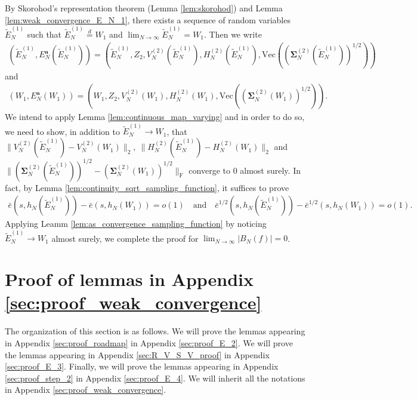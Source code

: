 \documentclass[12pt]{article}
\begin{document}
\noindent By Skorohod's representation theorem (Lemma \ref{lem:skorohod}) and Lemma \ref{lem:weak_convergence_E_N_1}, there exists a sequence of random variables $\tilde{E}_{N}^{(1)}$ such that $\tilde{E}_{N}^{(1)}\overset{d}{=}W_1$ and $\lim_{N\rightarrow\infty}\tilde{E}_{N}^{(1)}=W_1$. Then we write 
\begin{align*}
	(\tilde E_N^{(1)},E_N^{\textbf{a}}(\tilde E_N^{(1)}))=(\tilde E_N^{(1)},Z_2, V_N^{(2)}(\tilde E_N^{(1)}), H_N^{(2)}(\tilde E_N^{(1)}),\mathrm{Vec}((\bm\Sigma_N^{(2)}(\tilde E_N^{(1)}))^{1/2}))
\end{align*}
and 
\begin{align*}
	(W_1, E_N^{\textbf{a}}(W_1))=(W_1,Z_2, V_N^{(2)}(W_1), H_N^{(2)}(W_1),\mathrm{Vec}((\bm\Sigma_N^{(2)}(W_1))^{1/2})).
\end{align*}
We intend to apply Lemma \ref{lem:continuous_map_varying} and in order to do so, we need to show, in addition to $\tilde E_N^{(1)}\rightarrow W_1$, that $\|V_N^{(2)}(\tilde{E}_N^{(1)})-V_N^{(2)}(W_1)\|_2,\ \|H_N^{(2)}(\tilde{E}_N^{(1)})- H_N^{(2)}(W_1)\|_2$ and $\|(\bm\Sigma_N^{(2)}(\tilde{E}_N^{(1)}))^{1/2}-(\bm\Sigma_N^{(2)}(W_1))^{1/2}\|_{\mathrm{F}}$
converge to $0$ almost surely. In fact, by Lemma \ref{lem:continuity_sqrt_sampling_function}, it suffices to prove
\small
\begin{align*}
	\bar e(s,h_N(\tilde E_N^{(1)}))-\bar e(s,h_N(W_1))=o(1)\quad\text{and}\quad \bar e^{1/2}(s,h_N(\tilde E_N^{(1)}))-\bar e^{1/2}(s,h_N(W_1))=o(1).
\end{align*}
\normalsize
Applying Leamm \ref{lem:as_convergence_sampling_function} by noticing $\tilde E_N^{(1)}\rightarrow W_1$ almost surely, we complete the proof for $\lim_{N\rightarrow\infty}|B_N(f)|=0$. 







\section{Proof of lemmas in Appendix \ref{sec:proof_weak_convergence}}\label{sec:supporting_lemmas}

The organization of this section is as follows. We will prove the lemmas appearing in Appendix \ref{sec:proof_roadmap} in Appendix \ref{sec:proof_E_2}. We will prove the lemmas appearing in Appendix \ref{sec:R_V_S_V_proof} in Appendix \ref{sec:proof_E_3}. Finally, we will prove the lemmas appearing in Appendix \ref{sec:proof_step_2} in Appendix \ref{sec:proof_E_4}. We will inherit all the notations in Appendix \ref{sec:proof_weak_convergence}.
\end{document}

